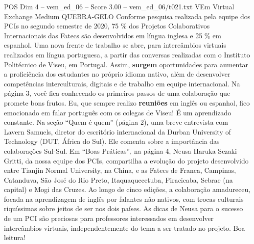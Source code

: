 \begin{textsample}{POS Dim 4 – vem\_ed\_06 – Score 3.00 – vem\_ed\_06/t021.txt}  \label{ex:f4_pos_123}
VEm Virtual Exchange Medium QUEBRA-GELO Conforme pesquisa realizada pela equipe dos PCIs no segundo semestre de 2020, 75 \% dos Projetos Colaborativos Internacionais das Fatecs são desenvolvidos em língua inglesa e 25 \% em espanhol.
Uma nova frente de trabalho se abre, para intercâmbios virtuais realizados em língua portuguesa, a partir das conversas realizadas com o Instituto Politécnico de Viseu, em Portugal.
Assim, \textbf{surgem} oportunidades para aumentar a proficiência dos estudantes no próprio idioma nativo, além de desenvolver competências interculturais, digitais e de trabalho em equipe internacional.
Na página 3, você fica conhecendo os primeiros passos de uma colaboração que promete bons frutos.
Eu, que sempre realizo \textbf{reuniões} em inglês ou espanhol, fico emocionado em falar português com os colegas de Viseu!
É um aprendizado constante.
Na seção “Quem é quem” (página 2), uma breve entrevista com Lavern Samuels, diretor do escritório internacional da Durban University of Technology (DUT, África do Sul).
Ele comenta sobre a importância das colaborações Sul-Sul.
Em “Boas Práticas”, na página 4, Neusa Haruka Sezaki Gritti, da nossa equipe dos PCIs, compartilha a evolução do projeto desenvolvido entre Tianjin Normal University, na China, e as Fatecs de Franca, Campinas, Catanduva, São José do Rio Preto, Itaquaquecetuba, Piracicaba, Sebrae (na capital) e Mogi das Cruzes.
Ao longo de cinco edições, a colaboração amadureceu, focada na aprendizagem de inglês por falantes não nativos, com trocas culturais riquíssimas sobre jeitos de ser nos dois países.
As dicas de Neusa para o sucesso de um PCI são preciosas para professores interessados em desenvolver intercâmbios virtuais, independentemente do tema a ser tratado no projeto.
Boa leitura!

\end{textsample}
